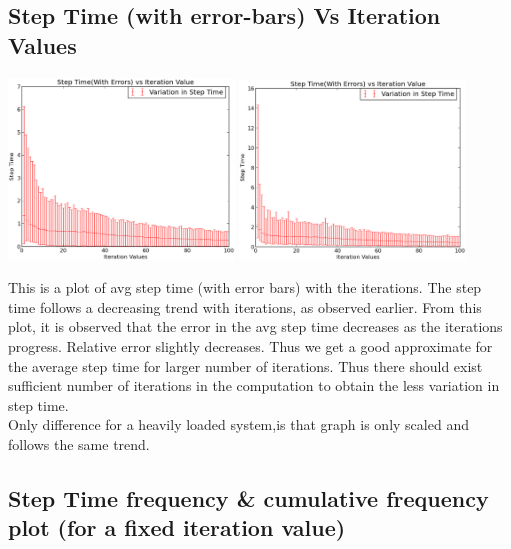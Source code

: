 \documentclass[11pt, a4paper]{article}
\begin{document}
\subsection{Step Time (with error-bars) Vs Iteration Values}
\begin{center}
\includegraphics[width = 6cm]{plots-normal/l5.eps}
\includegraphics[width = 6cm]{plots-high/h5.eps}
\end{center}


This is a plot of avg step time (with error bars) with the iterations. The step time follows a decreasing trend with iterations, as observed earlier. From this plot, it is observed that the error in the avg step time decreases as the iterations progress. Relative error slightly decreases. Thus we get a good approximate for the average step time for larger number of iterations. Thus there should exist sufficient number of iterations in the computation to obtain the less variation in step time.\\
Only difference for a heavily loaded system,is that graph is only scaled and follows the same trend.

\subsection{Step Time frequency \& cumulative frequency plot (for a fixed iteration value)}
\end{document}
